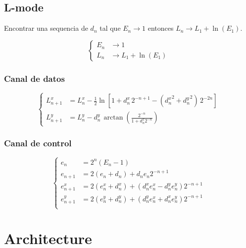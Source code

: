 \documentclass[10pt,a4paper]{book}
\begin{document}
\section{L-mode}
   Encontrar una sequencia de $d_n$ tal que $E_n \rightarrow 1$ entonces $L_n \rightarrow L_1 + \ln(E_1)$.

\begin{equation} \label{eq:bkm_E_mode}
   \left\{
      \begin{aligned}
         E_n & \rightarrow 1 \\
         L_n & \rightarrow L_1 + \ln(E_1)
      \end{aligned}
   \right.
\end{equation}

   \subsection{Canal de datos}
\begin{equation} \label{eq:bkm_eqs_L}
   \left\{
      \begin{aligned}
         L_{n+1}^x &= L_n^x - \frac{1}{2} \ln[ 1 + d_n^x \, 2^{-n+1} - ({d_n^x}^2 + {d_n^y}^2) \, 2^{-2n} ] \\
         L_{n+1}^y &= L_n^y - d_n^y \, \arctan{ \left( \frac{2^{-n}}{1+d_n^x 2^{-n}} \right) }
      \end{aligned}
   \right.
\end{equation}

   \subsection{Canal de control}
\begin{equation} \label{eq:bkm_eqs_e}
   \left\{
      \begin{aligned}
         e_n         &= 2^n (E_n - 1)                                            \\
         e_{n+1}     &= 2 (e_n   + d_n) + d_n e_n 2^{-n+1}                       \\
         e_{n+1}^x   &= 2 (e_n^x + d_n^x) + (d_n^x e_n^x - d_n^y e_n^y) 2^{-n+1} \\
         e_{n+1}^y   &= 2 (e_n^y + d_n^y) + (d_n^y e_n^x + d_n^x e_n^y) 2^{-n+1} \\
      \end{aligned}
   \right.
\end{equation}

\chapter{Architecture}
\end{document}
